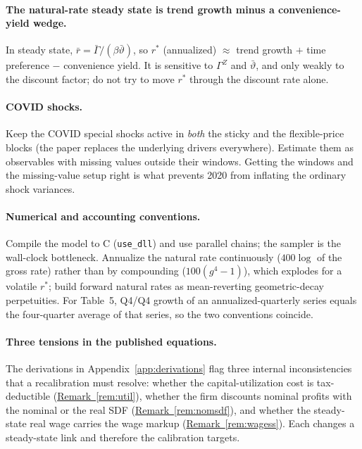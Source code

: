 \documentclass[11pt]{article}
\theoremstyle{definition}
\newcommand{\rstar}{r^{*}}
\begin{document}
\paragraph{The natural-rate steady state is trend growth minus a convenience-yield wedge.}
In steady state, $\bar r=\bar\Gamma/(\beta\bar\vartheta)$, so $\rstar$ (annualized) $\approx$ trend
growth $+$ time preference $-$ convenience yield. It is sensitive to $\Gamma^Z$ and $\bar\vartheta$, and
only weakly to the discount factor; do not try to move $\rstar$ through the discount rate alone.

\paragraph{COVID shocks.}
Keep the COVID special shocks active in \emph{both} the sticky and the flexible-price blocks (the paper
replaces the underlying drivers everywhere). Estimate them as observables with missing values outside
their windows. Getting the windows and the missing-value setup right is what prevents 2020 from
inflating the ordinary shock variances.

\paragraph{Numerical and accounting conventions.}
Compile the model to C (\texttt{use\_dll}) and use parallel chains; the sampler is the wall-clock
bottleneck. Annualize the natural rate continuously ($400\log$ of the gross rate) rather than by
compounding ($100(g^4-1)$), which explodes for a volatile $\rstar$; build forward natural rates as
mean-reverting geometric-decay perpetuities. For Table~5, Q4/Q4 growth of an annualized-quarterly series
equals the four-quarter average of that series, so the two conventions coincide.

\paragraph{Three tensions in the published equations.}
The derivations in Appendix~\ref{app:derivations} flag three internal inconsistencies that a
recalibration must resolve: whether the capital-utilization cost is tax-deductible
(\hyperref[rem:util]{Remark~\ref*{rem:util}}), whether the firm discounts nominal profits with the
nominal or the real SDF (\hyperref[rem:nomsdf]{Remark~\ref*{rem:nomsdf}}), and whether the steady-state
real wage carries the wage markup (\hyperref[rem:wagess]{Remark~\ref*{rem:wagess}}). Each changes a
steady-state link and therefore the calibration targets.
\end{document}
